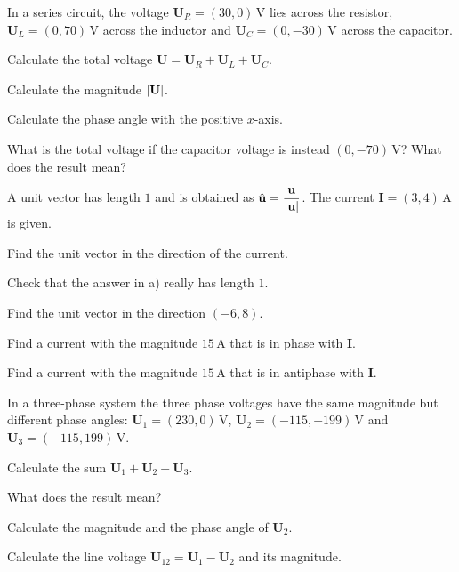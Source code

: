 In a series circuit, the voltage $\mathbf{U}_R = (30, 0)\,\text{V}$ lies across the resistor,
$\mathbf{U}_L = (0, 70)\,\text{V}$ across the inductor and $\mathbf{U}_C = (0, -30)\,\text{V}$
across the capacitor.
\begin{parts}
  \item Calculate the total voltage $\mathbf{U} = \mathbf{U}_R + \mathbf{U}_L + \mathbf{U}_C$.
  \item Calculate the magnitude $\lvert\mathbf{U}\rvert$.
  \item Calculate the phase angle with the positive $x$-axis.
  \item What is the total voltage if the capacitor voltage is instead $(0, -70)\,\text{V}$? What does
    the result mean?
\end{parts}

A unit vector has length $1$ and is obtained as $\hat{\mathbf{u}} =
\dfrac{\mathbf{u}}{\lvert\mathbf{u}\rvert}$. The current $\mathbf{I} = (3, 4)\,\text{A}$ is given.
\begin{parts}
  \item Find the unit vector in the direction of the current.
  \item Check that the answer in a) really has length $1$.
  \item Find the unit vector in the direction $(-6, 8)$.
  \item Find a current with the magnitude $15\,\text{A}$ that is in phase with $\mathbf{I}$.
  \item Find a current with the magnitude $15\,\text{A}$ that is in antiphase with $\mathbf{I}$.
\end{parts}

In a three-phase system the three phase voltages have the same magnitude but different phase
angles: $\mathbf{U}_1 = (230, 0)\,\text{V}$, $\mathbf{U}_2 = (-115, -199)\,\text{V}$ and
$\mathbf{U}_3 = (-115, 199)\,\text{V}$.
\begin{parts}
  \item Calculate the sum $\mathbf{U}_1 + \mathbf{U}_2 + \mathbf{U}_3$.
  \item What does the result mean?
  \item Calculate the magnitude and the phase angle of $\mathbf{U}_2$.
  \item Calculate the line voltage $\mathbf{U}_{12} = \mathbf{U}_1 - \mathbf{U}_2$ and its magnitude.
\end{parts}

